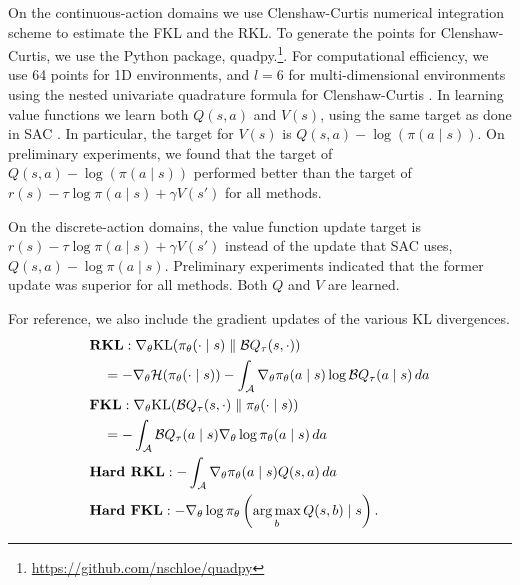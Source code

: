 \documentclass[\main/thesis.tex]{subfiles}
\begin{document}
On the continuous-action domains we use Clenshaw-Curtis \citep{clenshaw1960method} numerical integration scheme to estimate the FKL and the RKL. To generate the points for Clenshaw-Curtis, we use the Python package, quadpy.\footnote{\url{https://github.com/nschloe/quadpy}}. For computational efficiency, we use 64 points for 1D environments, and $l=6$ for multi-dimensional environments using the nested univariate quadrature formula for Clenshaw-Curtis \citep{gerstner1998numerical}. In learning value functions we learn both $Q(s, a)$ and $V(s)$, using the same target as done in SAC \citep{haarnoja2018soft}. In particular, the target for $V(s)$ is $Q(s, a) - \log(\pi(a \mid s))$. On preliminary experiments, we found that the target of $Q(s, a) - \log(\pi(a \mid s))$ performed better than the target of $r(s) - \tau \log \pi(a \mid s) + \gamma V(s')$ for all methods.

On the discrete-action domains, the value function update target is $r(s) - \tau \log \pi(a \mid s) + \gamma V(s')$ instead of the update that SAC uses, $Q(s, a) - \log \pi(a \mid s)$. Preliminary experiments indicated that the former update was superior for all methods. Both $Q$ and $V$ are learned. 

For reference, we also include the gradient updates of the various KL divergences. 
\begin{align}
    &\textbf{RKL}: \nabla_\theta \mathrm{KL}(\pi_\theta(\cdot \mid s) \parallel \mathcal{B}Q_\tau(s, \cdot)) \nonumber\\
    &\quad= -\nabla_\theta \mathcal{H}(\pi_\theta(\cdot \mid s)) - \int_{\mathcal{A}}\nabla_\theta \pi_\theta(a \mid s) \log \mathcal{B}Q_\tau(a \mid s)\, da \label{eq:rkl-gradient}\\
    &\textbf{FKL}: \nabla_\theta \mathrm{KL}(\mathcal{B}Q_\tau(s, \cdot) \parallel \pi_\theta(\cdot \mid s) )\nonumber\\
    &\quad= - \int_{\mathcal{A}}  \mathcal{B}Q_\tau(a \mid s) \nabla_\theta \log \pi_\theta(a \mid s) \, da \label{eq:fkl-gradient} \\
    &\textbf{Hard RKL}: - \int_{\mathcal{A}}\nabla_\theta \pi_\theta(a \mid s) Q(s, a)\, da \label{eq:hrkl-gradient}\\
    &\textbf{Hard FKL}: -\nabla_\theta \log \pi_\theta \left(\operatorname*{arg\,max}_b Q(s, b) \mid s\right) \label{eq:hfkl-gradient}.
\end{align}
\end{document}
